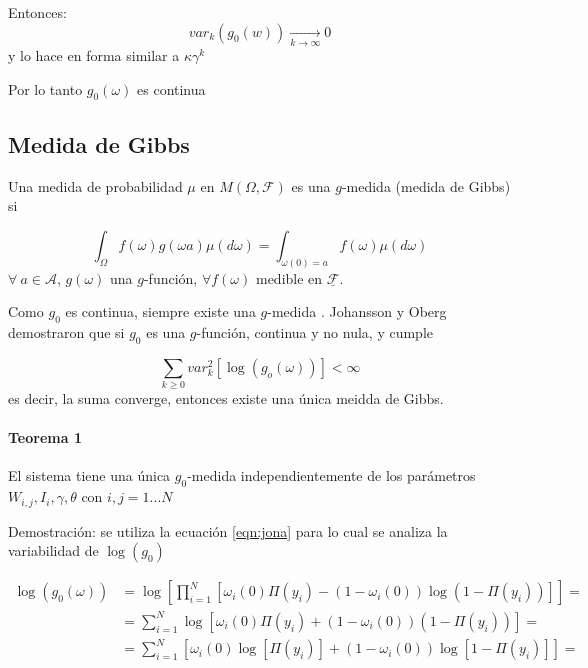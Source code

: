 Entonces:
\begin{equation}
    var_k(g_0(w)) \xrightarrow[k\rightarrow \infty]{} 0
\end{equation}
y lo hace en forma similar a $\kappa \gamma^k$

Por lo tanto $g_0(\omega)$ es continua

\subsection{Medida de Gibbs}
Una medida de probabilidad $\mu$ en $M(\Omega, \mathcal{F})$ es una $g$-medida (medida de Gibbs) si \cite{keane_strongly_1972}

\begin{equation}
    \int_\Omega f(\omega) g(\omega a) \mu(d\omega) = \int_{\omega(0)=a} f(\omega) \mu(d\omega)
\end{equation}
$\forall \ a \in \mathcal{A}$, $g(\omega)$ una $g$-función, $\forall f(\omega)$ medible en $\underline{\mathcal{F}}$.

Como $g_0$ es continua, siempre existe una $g$-medida \cite{keane_strongly_1972}. Johansson y Oberg \cite{johansson_square_2003} demostraron que si $g_0$ es una $g$-función, continua y no nula, y cumple

\begin{equation}
    \sum_{k\geq 0} var^2_k[\log(g_o(\omega))] < \infty
    \label{eqn:jona}
\end{equation}
es decir, la suma converge, entonces existe una única meidda de Gibbs.

\paragraph{Teorema 1} El sistema tiene una única $g_0$-medida independientemente de los parámetros $W_{i,j} , I_i, \gamma, \theta$ con $i,j=1...N$

Demostración: se utiliza la ecuación \eqref{eqn:jona} para lo cual se analiza la variabilidad de $\log(g_0)$

\begin{align*}
    \log(g_0(\omega))  & = \log \left[ \prod_{i=1}^N \left[ \omega_i(0)\Pi(y_i) - (1-\omega_i(0))\log(1-\Pi(y_i))\right] \right] = \\
     &= \sum_{i=1}^N \log\left[ \omega_i(0) \Pi(y_i)+(1-\omega_i(0))(1-\Pi(y_i)) \right] = \\
     &= \sum_{i=1}^N \left[ \omega_i(0) \log\left[\Pi(y_i)\right]+(1-\omega_i(0))\log\left[1-\Pi(y_i) \right] \right] = 
\end{align*}

